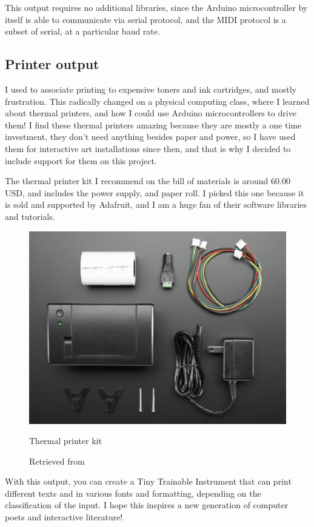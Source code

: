 This output requires no additional libraries, since the Arduino microcontroller by itself is able to communicate via serial protocol, and the MIDI protocol is a subset of serial, at a particular baud rate.

\subsection{Printer output}

I used to associate printing to expensive toners and ink cartridges, and mostly frustration. This radically changed on a physical computing class, where I learned about thermal printers, and how I could use Arduino microcontrollers to drive them! I find these thermal printers amazing because they are mostly a one time investment, they don't need anything besides paper and power, so I have used them for interactive art installations since then, and that is why I decided to include support for them on this project.

The thermal printer kit I recommend on the bill of materials is around 60.00 USD, and includes the power supply, and paper roll. I picked this one because it is sold and supported by Adafruit, and I am a huge fan of their software libraries and tutorials. 

\begin{figure}[ht]
  \centering
  \includegraphics[width=0.75\linewidth,height=0.25\textheight,keepaspectratio]{images/materials-adafruit-thermal-printer.jpg}
  \caption{Thermal printer kit}
  \caption*{Retrieved from \cite{website-materials-adafruit-thermal-printer}}
  \label{fig:materials-adafruit-thermal-printer}
\end{figure}

With this output, you can create a Tiny Trainable Instrument that can print different texts and in various fonts and formatting, depending on the classification of the input. I hope this inspires a new generation of computer poets and interactive literature!

